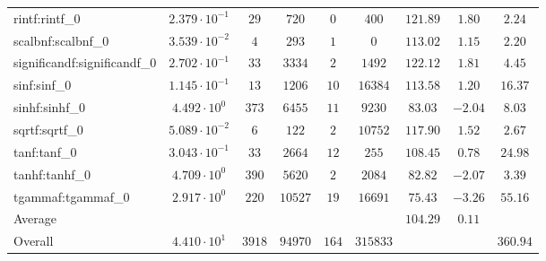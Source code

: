 \begin{tabular}{|l|c|c|c|c|c|c|c|c|}
rintf:rintf\_0               & $ 2.379 \cdot 10^{-1} $ & $ 29     $ & $ 720   $ & $ 0   $ & $ 400    $ & $ 121.89      $ & $ 1.80    $ & $ 2.24    $ \\
scalbnf:scalbnf\_0           & $ 3.539 \cdot 10^{-2} $ & $ 4      $ & $ 293   $ & $ 1   $ & $ 0      $ & $ 113.02      $ & $ 1.15    $ & $ 2.20    $ \\
significandf:significandf\_0 & $ 2.702 \cdot 10^{-1} $ & $ 33     $ & $ 3334  $ & $ 2   $ & $ 1492   $ & $ 122.12      $ & $ 1.81    $ & $ 4.45    $ \\
sinf:sinf\_0                 & $ 1.145 \cdot 10^{-1} $ & $ 13     $ & $ 1206  $ & $ 10  $ & $ 16384  $ & $ 113.58      $ & $ 1.20    $ & $ 16.37   $ \\
sinhf:sinhf\_0               & $ 4.492 \cdot 10^{0}  $ & $ 373    $ & $ 6455  $ & $ 11  $ & $ 9230   $ & $ 83.03       $ & $ -2.04   $ & $ 8.03    $ \\
sqrtf:sqrtf\_0               & $ 5.089 \cdot 10^{-2} $ & $ 6      $ & $ 122   $ & $ 2   $ & $ 10752  $ & $ 117.90      $ & $ 1.52    $ & $ 2.67    $ \\
tanf:tanf\_0                 & $ 3.043 \cdot 10^{-1} $ & $ 33     $ & $ 2664  $ & $ 12  $ & $ 255    $ & $ 108.45      $ & $ 0.78    $ & $ 24.98   $ \\
tanhf:tanhf\_0               & $ 4.709 \cdot 10^{0}  $ & $ 390    $ & $ 5620  $ & $ 2   $ & $ 2084   $ & $ 82.82       $ & $ -2.07   $ & $ 3.39    $ \\
tgammaf:tgammaf\_0           & $ 2.917 \cdot 10^{0}  $ & $ 220    $ & $ 10527 $ & $ 19  $ & $ 16691  $ & $ 75.43       $ & $ -3.26   $ & $ 55.16   $ \\
\hline
Average                      & $                     $ & $        $ & $       $ & $     $ & $        $ & $ 104.29      $ & $ 0.11    $ & $         $ \\
\hline
Overall                      & $ 4.410 \cdot 10^{1}  $ & $ 3918   $ & $ 94970 $ & $ 164 $ & $ 315833 $ & $             $ & $         $ & $ 360.94  $ \\
\hline
\end{tabular}
